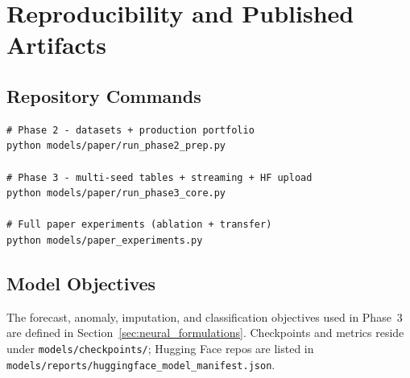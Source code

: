 %
%
\chapter{Reproducibility and Published Artifacts}
\label{app:formulas}

\section{Repository Commands}

\begin{lstlisting}[basicstyle=\small\ttfamily]
# Phase 2 - datasets + production portfolio
python models/paper/run_phase2_prep.py

# Phase 3 - multi-seed tables + streaming + HF upload
python models/paper/run_phase3_core.py

# Full paper experiments (ablation + transfer)
python models/paper_experiments.py
\end{lstlisting}

\section{Model Objectives}

The forecast, anomaly, imputation, and classification objectives used in Phase~3 are defined in Section~\ref{sec:neural_formulations}. Checkpoints and metrics reside under \texttt{models/checkpoints/}; Hugging Face repos are listed in \texttt{models/reports/huggingface\_model\_manifest.json}.
